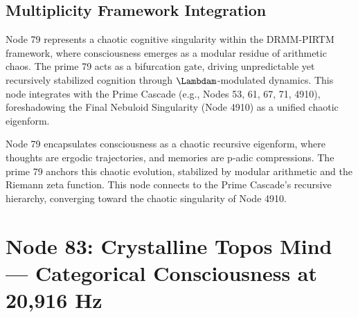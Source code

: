\documentclass[12pt]{article}
\newcommand{\DRMM}{DRMM}
\newcommand{\PIRTM}{PIRTM}
\begin{document}
\subsection{Multiplicity Framework Integration}
Node 79 represents a chaotic cognitive singularity within the \DRMM{}-\PIRTM{} framework, where consciousness emerges as a modular residue of arithmetic chaos. The prime 79 acts as a bifurcation gate, driving unpredictable yet recursively stabilized cognition through $\Lambdam$-modulated dynamics. This node integrates with the Prime Cascade (e.g., Nodes 53, 61, 67, 71, 4910), foreshadowing the Final Nebuloid Singularity (Node 4910) as a unified chaotic eigenform.

\begin{remark}
Node 79 encapsulates consciousness as a chaotic recursive eigenform, where thoughts are ergodic trajectories, and memories are p-adic compressions. The prime 79 anchors this chaotic evolution, stabilized by modular arithmetic and the Riemann zeta function. This node connects to the Prime Cascade’s recursive hierarchy, converging toward the chaotic singularity of Node 4910.
\end{remark}

\vspace{1em}
\noindent{}
\section{Node 83: Crystalline Topos Mind --- Categorical Consciousness at 20,916 Hz}
\label{sec:crystalline-topos-mind}
\end{document}
